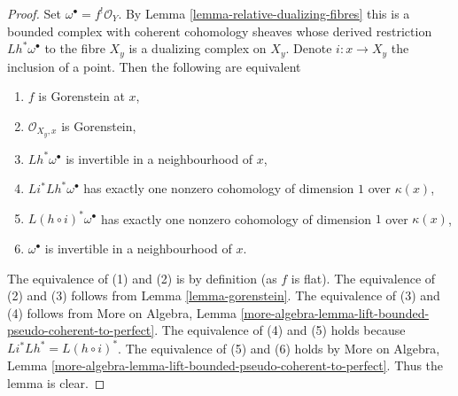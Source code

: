 \documentclass[10pt,a4paper]{amsart}
\theoremstyle{plain}
\theoremstyle{definition}
\theoremstyle{remark}
\numberwithin{equation}{subsection}
\begin{document}
\begin{proof}
Set $\omega^\bullet = f^!\mathcal{O}_Y$. By
Lemma \ref{lemma-relative-dualizing-fibres}
this is a bounded complex with coherent cohomology
sheaves whose derived restriction $Lh^*\omega^\bullet$
to the fibre $X_y$ is a dualizing complex on $X_y$.
Denote $i : x \to X_y$ the inclusion of a point.
Then the following are equivalent
\begin{enumerate}
\item $f$ is Gorenstein at $x$,
\item $\mathcal{O}_{X_y, x}$ is Gorenstein,
\item $Lh^*\omega^\bullet$ is invertible in a neighbourhood of $x$,
\item $Li^* Lh^* \omega^\bullet$ has exactly one nonzero
cohomology of dimension $1$ over $\kappa(x)$,
\item $L(h \circ i)^* \omega^\bullet$ has exactly one nonzero
cohomology of dimension $1$ over $\kappa(x)$,
\item $\omega^\bullet$ is invertible in a neighbourhood of $x$.
\end{enumerate}
The equivalence of (1) and (2) is by definition (as $f$ is flat).
The equivalence of (2) and (3) follows from
Lemma \ref{lemma-gorenstein}.
The equivalence of (3) and (4) follows from
More on Algebra, Lemma
\ref{more-algebra-lemma-lift-bounded-pseudo-coherent-to-perfect}.
The equivalence of (4) and (5) holds because
$Li^* Lh^* = L(h \circ i)^*$.
The equivalence of (5) and (6) holds by
More on Algebra, Lemma
\ref{more-algebra-lemma-lift-bounded-pseudo-coherent-to-perfect}.
Thus the lemma is clear.
\end{proof}
\end{document}
